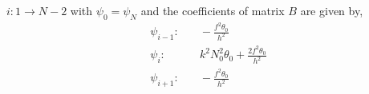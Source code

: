 $i: 1 \rightarrow N-2$ with $\psi_0 = \psi_{N}$
and the coefficients of matrix $B$ are given by,
\begin{equation*}
		\begin{aligned}
	\psi_{i-1}:& \quad -\frac{f^2\theta_0}{h^2}\\
	\psi_i:& \quad k^2N_0^2\theta_0 + \frac{2f^2\theta_0}{h^2}\\
	\psi_{i+1}:& \quad -\frac{f^2\theta_0}{h^2}\\
	\end{aligned}
\end{equation*}